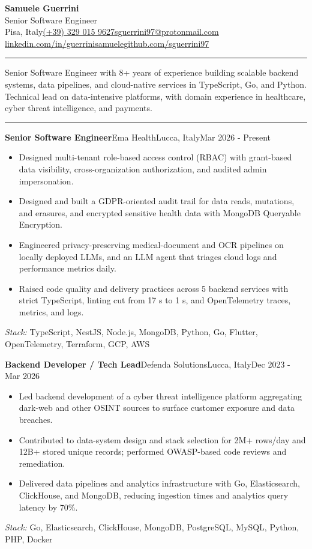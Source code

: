 \documentclass[10pt,a4paper]{article}
\newcommand{\cvsep}{\enspace\textperiodcentered\enspace}
\newcommand{\cvheader}[1]{%
  {\centering
  #1\par}%
  \vspace{0.2em}%
}
\newcommand{\cvsection}[1]{%
  \par\vspace{0.85em}%
  \noindent{\large\bfseries #1}\par
  \vspace{0.20em}\hrule\vspace{0.55em}%
}
\newcommand{\role}[4]{%
  \noindent\textbf{#1}\cvsep #2\cvsep #3\hfill #4\par
}
\newcommand{\tech}[1]{%
  {\small\textit{Stack:} #1\par}
  \vspace{0.80em}%
}
\newenvironment{cvitems}{%
  \vspace{0.20em}%
  \setlength{\leftmargini}{1.00em}%
  \renewcommand{\labelitemi}{{\small\textbullet}}%
  \begin{itemize}%
}{%
  \end{itemize}\vspace{0.20em}%
}
\begin{document}
\cvheader{%
  {\huge\textbf{Samuele Guerrini}}\\[0.20em]
  {\large Senior Software Engineer}\\[0.35em]
  Pisa, Italy\cvsep \href{tel:+393290159627}{(+39) 329 015 9627}\cvsep \href{mailto:sguerrini97@protonmail.com}{sguerrini97@protonmail.com}\\
  \href{https://linkedin.com/in/guerrinisamuele/}{linkedin.com/in/guerrinisamuele}\cvsep \href{https://github.com/sguerrini97}{github.com/sguerrini97}
}

\cvsection{Professional Summary}
Senior Software Engineer with 8+ years of experience building scalable backend systems, data pipelines, and cloud-native services in TypeScript, Go, and Python. Technical lead on data-intensive platforms, with domain experience in healthcare, cyber threat intelligence, and payments.

\cvsection{Professional Experience}
\role{Senior Software Engineer}{Ema Health}{Lucca, Italy}{Mar 2026 - Present}
\begin{cvitems}
  \item Designed multi-tenant role-based access control (RBAC) with grant-based data visibility, cross-organization authorization, and audited admin impersonation.
  \item Designed and built a GDPR-oriented audit trail for data reads, mutations, and erasures, and encrypted sensitive health data with MongoDB Queryable Encryption.
  \item Engineered privacy-preserving medical-document and OCR pipelines on locally deployed LLMs, and an LLM agent that triages cloud logs and performance metrics daily.
  \item Raised code quality and delivery practices across 5 backend services with strict TypeScript, linting cut from 17 s to 1 s, and OpenTelemetry traces, metrics, and logs.
\end{cvitems}
\tech{TypeScript, NestJS, Node.js, MongoDB, Python, Go, Flutter, OpenTelemetry, Terraform, GCP, AWS}

\role{Backend Developer / Tech Lead}{Defenda Solutions}{Lucca, Italy}{Dec 2023 - Mar 2026}
\begin{cvitems}
  \item Led backend development of a cyber threat intelligence platform aggregating dark-web and other OSINT sources to surface customer exposure and data breaches.
  \item Contributed to data-system design and stack selection for 2M+ rows/day and 12B+ stored unique records; performed OWASP-based code reviews and remediation.
  \item Delivered data pipelines and analytics infrastructure with Go, Elasticsearch, ClickHouse, and MongoDB, reducing ingestion times and analytics query latency by 70\%.
\end{cvitems}
\tech{Go, Elasticsearch, ClickHouse, MongoDB, PostgreSQL, MySQL, Python, PHP, Docker}
\end{document}
